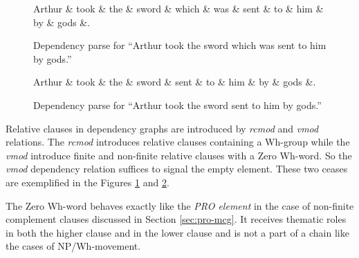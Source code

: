     \begin{figure}[!ht]
    	\centering
    	\begin{dependency}
    		\begin{deptext}[]
    			Arthur \& took \& the \& sword \& which \& was \& sent \& to \& him \& by \& gods \&. \\
    		\end{deptext}
    	\end{dependency}
    	\caption{Dependency parse for ``Arthur took the sword which was sent to him by gods.''}
    	\label{fig:e20}
        \end{figure}
        
        \begin{figure}[!ht]
    	\centering
    	\begin{dependency}
    		\begin{deptext}[]
    			Arthur \& took \& the \& sword \& sent \& to \& him \& by \& gods \&. \\
    		\end{deptext}
    	\end{dependency}
    	\caption{Dependency parse for ``Arthur took the sword sent to him by gods.''}
    	\label{fig:e21}
    \end{figure}

    Relative clauses in dependency graphs are introduced by \textit{rcmod} and \textit{vmod} relations. The \textit{rcmod} introduces relative clauses containing a Wh-group while the \textit{vmod} introduce finite and non-finite relative clauses with a Zero Wh-word. So the \textit{vmod} dependency relation suffices to signal the empty element. These two ceases are exemplified in the Figures  \ref{fig:e20} and \ref{fig:e21}.

    The Zero Wh-word behaves exactly like the \textit{PRO element} in the case of non-finite complement clauses discussed in Section \ref{sec:pro-mcg}. It receives thematic roles in both the higher clause and in the lower clause and is not a part of a chain like the cases of NP/Wh-movement.

